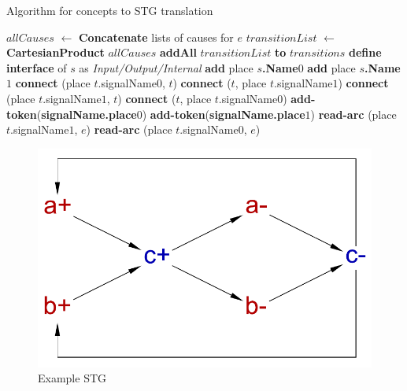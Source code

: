 \documentclass[british,conference,compsoc]{IEEEtran}
\begin{document}
\begin{algorithm}[H]
\begin{algorithmic}[1]
\caption{Algorithm for concepts to STG translation\label{alg:translation}}
  \State $allCauses$ $\leftarrow$ \textbf{Concatenate} lists of causes for $e$ \label{alg:list}
  \State $transitionList$ $\leftarrow$ \textbf{CartesianProduct} $allCauses$
  \State \textbf{addAll} $transitionList$ \textbf{to} $transitions$
\EndFor
{}
  \State \textbf{define interface} of $s$ as \emph{Input/Output/Internal}
  \State \textbf{add} place \textbf{$s$.Name}$0$
  \State \textbf{add} place \textbf{$s$.Name}$1$
      \State \textbf{connect} (place $t$.signalName$0$, $t$)
      \State \textbf{connect} ($t$, place $t$.signalName$1$)
      \State \textbf{connect} (place $t$.signalName$1$, $t$)
      \State \textbf{connect} ($t$, place $t$.signalName$0$)
    \EndIf
  \EndFor
\EndFor
{}
    \State \textbf{add-token}(\textbf{signalName.place}$0$)
    \State \textbf{add-token}(\textbf{signalName.place}$1$)
  \EndIf
\EndFor
{}
      \State \textbf{read-arc} (place $t$.signalName$1$, $e$)
    \EndFor
      \State \textbf{read-arc} (place $t$.signalName$0$, $e$)
    \EndFor
  \EndIf
\EndFor
\end{algorithmic}
\end{algorithm}

\begin{figure}[h]
\vspace{-5mm}
\begin{centering}
\includegraphics[scale=0.3]{Images/cElement-stg.pdf}
\par\end{centering}
\protect\caption{\label{fig:cElement-stg} Example STG}
\vspace{-3mm}
\end{figure}
\end{document}
